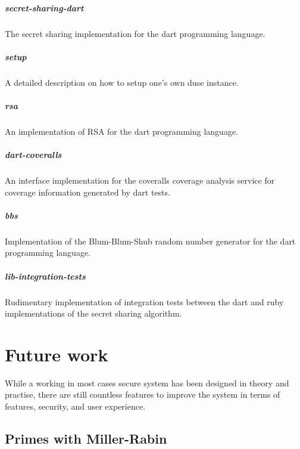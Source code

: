 \paragraph{secret-sharing-dart} The secret sharing implementation for the
dart programming language.

\paragraph{setup} A detailed description on how to setup one's own duse
instance.

\paragraph{rsa} An implementation of RSA for the dart programming language.

\paragraph{dart-coveralls} An interface implementation for the coveralls
coverage analysis service for coverage information generated by dart tests.

\paragraph{bbs} Implementation of the Blum-Blum-Shub random number generator
for the dart programming language.

\paragraph{lib-integration-tests} Rudimentary implementation of integration
tests between the dart and ruby implementations of the secret sharing algorithm.

\chapter{Future work}

While a working in most cases secure system has been designed in theory and
practise, there are still countless features to improve the system in terms of
features, security, and user experience.

\section{Primes with Miller-Rabin}

